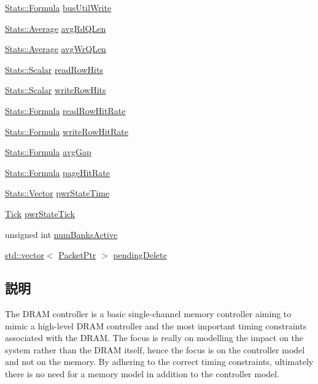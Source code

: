\begin{DoxyCompactItemize}
\item 
\hyperlink{classStats_1_1Formula}{Stats::Formula} \hyperlink{classDRAMCtrl_a414d3be953606d246b346cc75032e7d5}{busUtilWrite}
\item 
\hyperlink{classStats_1_1Average}{Stats::Average} \hyperlink{classDRAMCtrl_ab0f0022a38b8ccefd6d4d17ed434fcea}{avgRdQLen}
\item 
\hyperlink{classStats_1_1Average}{Stats::Average} \hyperlink{classDRAMCtrl_a4cdec63bcb455cfe5f1d8e6db40b66f5}{avgWrQLen}
\item 
\hyperlink{classStats_1_1Scalar}{Stats::Scalar} \hyperlink{classDRAMCtrl_a7f3862d0c1944536c2ec30b0d012e288}{readRowHits}
\item 
\hyperlink{classStats_1_1Scalar}{Stats::Scalar} \hyperlink{classDRAMCtrl_a5b75e7220ef0da8a50fe5777a9a1ae52}{writeRowHits}
\item 
\hyperlink{classStats_1_1Formula}{Stats::Formula} \hyperlink{classDRAMCtrl_a085bc7747d9a41218a9de406bf814c64}{readRowHitRate}
\item 
\hyperlink{classStats_1_1Formula}{Stats::Formula} \hyperlink{classDRAMCtrl_ae193ec834aceec0ed536dc53ec409f22}{writeRowHitRate}
\item 
\hyperlink{classStats_1_1Formula}{Stats::Formula} \hyperlink{classDRAMCtrl_ab29b83e3d43dd519d59172a842b673a3}{avgGap}
\item 
\hyperlink{classStats_1_1Formula}{Stats::Formula} \hyperlink{classDRAMCtrl_a8ec7f3dd4d238e4283760a15dc16c965}{pageHitRate}
\item 
\hyperlink{classStats_1_1Vector}{Stats::Vector} \hyperlink{classDRAMCtrl_ad084b0fe354d053d0f369a72b8559291}{pwrStateTime}
\item 
\hyperlink{base_2types_8hh_a5c8ed81b7d238c9083e1037ba6d61643}{Tick} \hyperlink{classDRAMCtrl_a06e80ba25d388ee981f9c88e27e189df}{pwrStateTick}
\item 
unsigned int \hyperlink{classDRAMCtrl_a2742d81312b2f4e257aaa3690989bc88}{numBanksActive}
\item 
\hyperlink{classstd_1_1vector}{std::vector}$<$ \hyperlink{classPacket}{PacketPtr} $>$ \hyperlink{classDRAMCtrl_a21da4bea3554874b557428e4cce5d4a4}{pendingDelete}
\end{DoxyCompactItemize}


\subsection{説明}
The DRAM controller is a basic single-\/channel memory controller aiming to mimic a high-\/level DRAM controller and the most important timing constraints associated with the DRAM. The focus is really on modelling the impact on the system rather than the DRAM itself, hence the focus is on the controller model and not on the memory. By adhering to the correct timing constraints, ultimately there is no need for a memory model in addition to the controller model.


